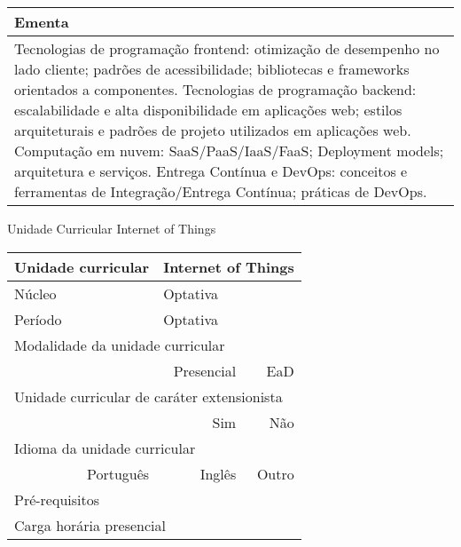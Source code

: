 \begin{quadro}[ht!]
\begin{tabular}{|p{3cm} p{2cm} p{3cm} p{2cm} p{3cm} p{2cm}|}
\multicolumn{6}{|p{15cm}|}{\cellcolor{blue1} Ementa} \\\hline
\hline\multicolumn{6}{|p{15cm}|}{\scriptsize Tecnologias de programação frontend: otimização de desempenho no lado cliente; padrões de acessibilidade; bibliotecas e frameworks orientados a componentes. Tecnologias de programação backend: escalabilidade e alta disponibilidade em aplicações web; estilos arquiteturais e padrões de projeto utilizados em aplicações web. Computação em nuvem: SaaS/PaaS/IaaS/FaaS; Deployment models; arquitetura e serviços. Entrega Contínua e DevOps: conceitos e ferramentas de Integração/Entrega Contínua; práticas de DevOps.}\\\hline 
\hline
	\end{tabular}
\end{quadro}


\begin{quadro}[ht!]
  \centering\scriptsize
\caption{Unidade Curricular Internet of Things}
\label{unit_53}
\begin{tabular}{|p{3cm} p{2cm} p{3cm} p{2cm} p{3cm} p{2cm}|}\hline
\multicolumn{1}{|p{3cm}|}{\cellcolor{blue1} Unidade curricular} & \multicolumn{5}{p{9cm}|}{Internet of Things}\\\hline
\multicolumn{1}{|p{3cm}|}{\cellcolor{blue1} Núcleo} & \multicolumn{5}{p{11.5cm}|}{Optativa}\\\hline
\multicolumn{1}{|p{3cm}|}{\cellcolor{blue1} Período} & \multicolumn{5}{p{9cm}|}{Optativa}\\\hline
\multicolumn{6}{|p{15cm}|}{\cellcolor{blue1} Modalidade da unidade curricular} \\\hline
\multicolumn{2}{|r}{		} &  \multicolumn{2}{r}{Presencial \Square} & \multicolumn{2}{r|}{EaD \XBox	} \\\hline
\multicolumn{6}{|p{15cm}|}{\cellcolor{blue1} Unidade curricular de caráter extensionista} \\\hline
\multicolumn{4}{|r}{			Sim \Square	} & \multicolumn{2}{r|}{	Não \XBox	}\\\hline
\multicolumn{6}{|p{15cm}|}{\cellcolor{blue1} Idioma da unidade curricular} \\ \hline
\multicolumn{2}{|r}{	Português \XBox	} &  \multicolumn{2}{r}{	Inglês \Square	} & \multicolumn{2}{r|}{	Outro \Square	} \\ \hline
\multicolumn{1}{|p{3cm}|}{\cellcolor{blue1} Pré-requisitos} & \multicolumn{5}{p{9cm}|}{}\\ \hline
\multicolumn{6}{|p{15cm}|}{\cellcolor{blue1} Carga horária presencial} \\ \hline

\end{tabular}
\end{quadro}

